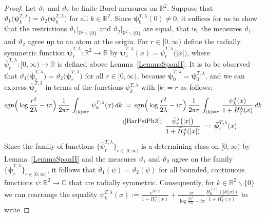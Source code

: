 \documentclass[10pt]{article}
\def\stackrel#1#2{\mathrel{\mathop{#2}\limits^{#1}}}
\numberwithin{equation}{section}
\theoremstyle{definition}
\newcommand{\R}{{\mathbb R}}
\newcommand{\C}{{\mathbb C}}
\begin{document}
\begin{appendix}
\begin{proof} Let $\vartheta_1$ and $\vartheta_2$ be finite Borel measures on $\R^2$.   Suppose that $\vartheta_1\big( \boldsymbol{\psi}^{T,\lambda}_{k} \big)=\vartheta_2\big( \boldsymbol{\psi}^{T,\lambda }_{k } \big)$ for all $k\in \R^2$.  Since $\boldsymbol{\psi}^{T,\lambda}_{0}(0)\neq 0$, it suffices for us to show that the restrictions  $\vartheta_1 |_{\R^2\backslash \{0\}}  $ and $ \vartheta_2 |_{\R^2\backslash \{0\}}  $ are equal, that is, the measures $\vartheta_1$ and $\vartheta_2$ agree up to an atom at the origin.
For $r\in [0,\infty)$ define the radially symmetric function $\boldsymbol{\bar{\psi}}^{T,\lambda }_{r}:\R^2\rightarrow \R$ by $\boldsymbol{\bar{\psi}}^{T,\lambda }_{r}(x)=\bar{\psi}^{T,\lambda}_r\big(|x|\big)$, where  $\bar{\psi}^{T,\lambda}_r:[0,\infty)\rightarrow \R$ is defined above Lemma~\ref{LemmaSpanII}. It is to be observed that $\vartheta_1\big(  \boldsymbol{\bar{\psi}}^{T,\lambda }_{r}\big)=\vartheta_2\big( \boldsymbol{\bar{\psi}}^{T,\lambda }_{r} \big)$ for all $r\in [0,\infty)$, because  $\boldsymbol{\bar{\psi}}^{T,\lambda}_0=\boldsymbol{\psi}^{T,\lambda }_{0 }$, and we can express $\boldsymbol{\bar{\psi}}^{T,\lambda }_{r}$ in terms of the functions $\psi^{T,\lambda }_{k}$ with $|k|=r$ as follows:
\begin{align*}
\textup{sgn}\Big(  \log \frac{r^2}{2\lambda} -i \pi \Big)\,\frac{1}{2\pi r}\,\int_{|k|=r}\, \psi^{T,\lambda }_{k}(x)\, dk\,&\,=\,\textup{sgn}\Big(  \log \frac{r^2}{2\lambda} -i \pi \Big) \,\frac{1}{2\pi r}\,\int_{|k|=r} \, \frac{ \psi^{\lambda}_k(x)   }{  1+H_{T}^{\lambda}(x) }\, dk\\ \,&  \hspace{-.14cm}\stackrel{ (\ref{BarPsiPh2}) }{=}\, \frac{\bar{\psi}^{\lambda}_r\big(|x|\big)  }{ 1+\bar{H}_{T}^{\lambda}(|x|)  }  \, =:\, \boldsymbol{\bar{\psi}}^{T,\lambda }_{r}(x)\,.
\end{align*}
 Since the family of functions $\{\bar{\psi}^{T,\lambda }_{r}\}_{r\in [0,\infty)}$ is   a determining class  on $[0,\infty)$ by Lemma~\ref{LemmaSpanII} and the measures $\vartheta_1$ and $\vartheta_2$ agree on the family  $\{ \boldsymbol{\bar{\psi}}^{T,\lambda }_{r}\}_{r\in [0,\infty)}$,  it follows that $\vartheta_1( \psi  )=\vartheta_2( \psi )$ for all bounded, continuous  functions $\psi:\R^2\rightarrow \C$ that are radially symmetric. Consequently,  for $k\in \R^2\backslash \{0\}$  we can  rearrange the equality $\psi^{T,\lambda}_{k}(x) :=\frac{ e^{ik\cdot x}  }{  1+H_{T}^{\lambda}(x)   }+\frac{  i\pi }{\log \frac{|k|^2}{2\lambda} -i\pi }\frac{H_0^{(1)}(|k||x|) }{  1+H_{T}^{\lambda}(x)   }$  to write

\end{proof}
\end{appendix}
\end{document}
